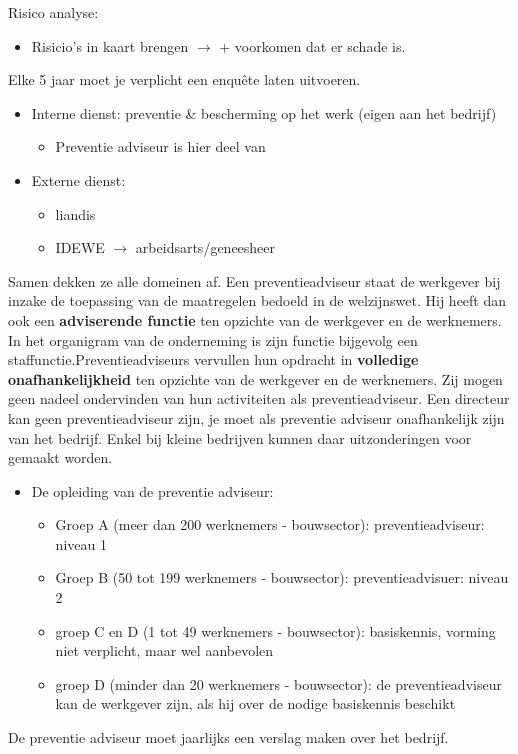 \documentclass[12pt]{article}
\begin{document}
Risico analyse:\begin{itemize}
    \item Risicio's in kaart brengen $\rightarrow$ + voorkomen dat er schade is.
\end{itemize}
Elke 5 jaar moet je verplicht een enquête laten uitvoeren.\begin{itemize}
    \item Interne dienst: preventie \& bescherming op het werk (eigen aan het bedrijf)\begin{itemize}
        \item Preventie adviseur is hier deel van
    \end{itemize}
    \item Externe dienst:\begin{itemize}
        \item liandis
        \item IDEWE $\rightarrow$ arbeidsarts/geneesheer
    \end{itemize}
\end{itemize}
Samen dekken ze alle domeinen af.\newline
Een preventieadviseur staat de werkgever bij inzake de toepassing van de maatregelen
bedoeld in de welzijnswet. Hij heeft dan ook een \textbf{adviserende functie} ten opzichte van de werkgever en de werknemers. In het organigram van de onderneming is zijn functie bijgevolg een staffunctie.Preventieadviseurs vervullen hun opdracht in \textbf{volledige onafhankelijkheid} ten opzichte van de werkgever en de werknemers. Zij mogen geen nadeel ondervinden van hun activiteiten als preventieadviseur.\newline
Een directeur kan geen preventieadviseur zijn, je moet als preventie adviseur onafhankelijk zijn van het bedrijf. Enkel bij kleine bedrijven kunnen daar uitzonderingen voor gemaakt worden.
\begin{itemize}
    \item De opleiding van de preventie adviseur:\begin{itemize}
        \item Groep A (meer dan 200 werknemers - bouwsector): preventieadviseur: niveau 1
        \item Groep B (50 tot 199 werknemers - bouwsector): preventieadvisuer: niveau 2
        \item groep C en D (1 tot 49 werknemers - bouwsector): basiskennis, vorming niet
        verplicht, maar wel aanbevolen
        \item groep D (minder dan 20 werknemers - bouwsector): de preventieadviseur kan de
        werkgever zijn, als hij over de nodige basiskennis beschikt
    \end{itemize}
\end{itemize}
De preventie adviseur moet jaarlijks een verslag maken over het bedrijf.
\end{document}
